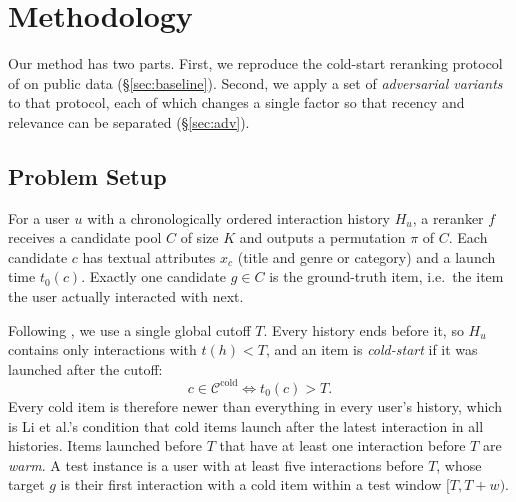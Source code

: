 \documentclass[11pt]{article}
\begin{document}
\section{Methodology}

Our method has two parts. First, we reproduce the cold-start reranking protocol of \citet{li2026llmreasoning} on public data (\S\ref{sec:baseline}). Second, we apply a set of \emph{adversarial variants} to that protocol, each of which changes a single factor so that recency and relevance can be separated (\S\ref{sec:adv}).

\subsection{Problem Setup}
For a user $u$ with a chronologically ordered interaction history $H_u$, a reranker $f$ receives a candidate pool $C$ of size $K$ and outputs a permutation $\pi$ of $C$. Each candidate $c$ has textual attributes $x_c$ (title and genre or category) and a launch time $t_0(c)$. Exactly one candidate $g \in C$ is the ground-truth item, i.e.\ the item the user actually interacted with next.

Following \citet{li2026llmreasoning}, we use a single global cutoff $T$. Every history ends before it, so $H_u$ contains only interactions with $t(h) < T$, and an item is \emph{cold-start} if it was launched after the cutoff:
\begin{equation}
  c \in \mathcal{C}^{\text{cold}} \iff t_0(c) > T.
\end{equation}
Every cold item is therefore newer than everything in every user's history, which is Li et al.'s condition that cold items launch after the latest interaction in all histories. Items launched before $T$ that have at least one interaction before $T$ are \emph{warm}. A test instance is a user with at least five interactions before $T$, whose target $g$ is their first interaction with a cold item within a test window $[T, T + w)$.
\end{document}
